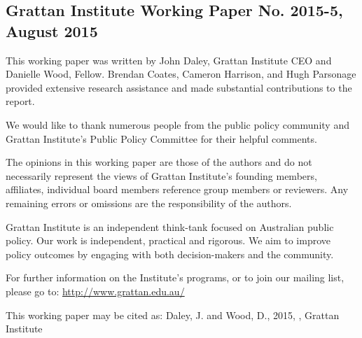 \subsection*{Grattan Institute Working Paper No. 2015-5, August 2015}
This working paper was written by John Daley, Grattan Institute CEO and
Danielle Wood, Fellow. Brendan Coates, Cameron Harrison, and Hugh
Parsonage provided extensive research assistance and made substantial
contributions to the report. 

We would like to thank numerous people from the public policy community and
Grattan Institute's Public Policy Committee for their helpful comments.

The opinions in this working paper are those of the authors and do not
necessarily represent the views of Grattan Institute's founding members,
affiliates, individual board members reference group members or reviewers. Any
remaining errors or omissions are the responsibility of the authors.


Grattan Institute is an independent think-tank focused on Australian public
policy. Our work is independent, practical and rigorous. We aim to improve
policy outcomes by engaging with both decision-makers and the community. 

For further information on the Institute's programs, or to join our mailing list,
please go to: \url{http://www.grattan.edu.au/}

{\small
This working paper may be cited as: Daley, J. and Wood, D., 2015, \textit{\mytitle}, Grattan Institute 
}